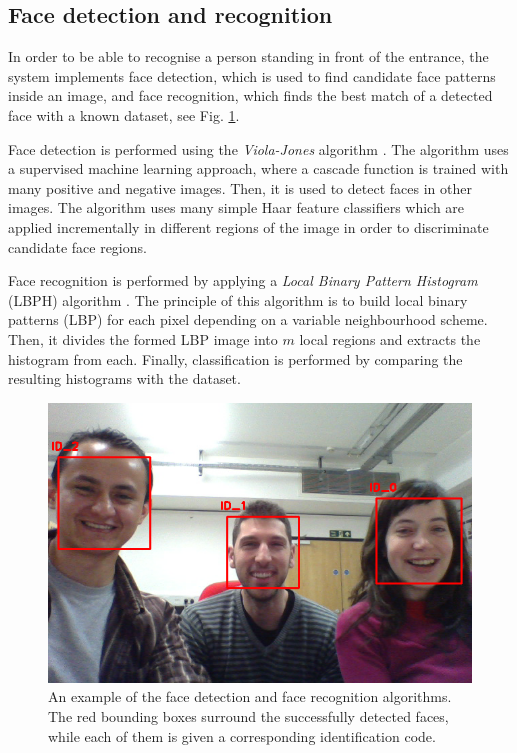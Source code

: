 \documentclass[conference]{IEEEtran}
\begin{document}
\subsection{\label{sec:vision}Face detection and recognition}
In order to be able to recognise a person standing in front of the entrance, the system implements face detection, which is used to find candidate face patterns inside an image, and face recognition, which finds the best match of a detected face with a known dataset, see Fig. \ref{fig:face}.

Face detection is performed using the \textit{Viola-Jones} algorithm \cite{Viola01_RapidObjDet}. The algorithm uses a supervised machine learning approach, where a cascade function is trained with many positive and negative images. Then, it is used to detect faces in other images. The algorithm uses many simple Haar feature classifiers which are applied incrementally in different regions of the image in order to discriminate candidate face regions.

Face recognition is performed by applying a \textit{Local Binary Pattern Histogram} (LBPH) algorithm \cite{Ahonen04_FaceRecLBP}. The principle of this algorithm is to build local binary patterns (LBP) for each pixel depending on a variable neighbourhood scheme. Then, it divides the formed LBP image into $m$ local regions and extracts the histogram from each. Finally, classification is performed by comparing the resulting histograms with the dataset.%

\begin{figure}[!t]
\centering
\includegraphics[width=3.in]{BARC_FaceRec.png}
\caption{An example of the face detection and face recognition algorithms. The red bounding boxes surround the successfully detected faces, while each of them is given a corresponding identification code.}
\label{fig:face}
\end{figure}
\end{document}
